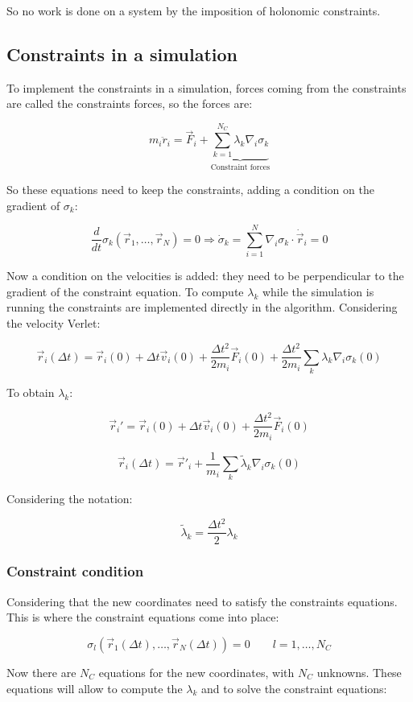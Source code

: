 	So no work is done on a system by the imposition of holonomic constraints.

	\subsection{Constraints in a simulation}
	To implement the constraints in a simulation, forces coming from the constraints are called the constraints forces, so the forces are:

	$$m_i\ddot{r}_i = \vec{F}_i + \underbrace{\sum\limits_{k=1}^{N_C}\lambda_k\nabla_i\sigma_k}_{\text{Constraint forces}}$$

	So these equations need to keep the constraints, adding a condition on the gradient of $\sigma_k$:

	$$\frac{d}{dt}\sigma_k(\vec{r}_1, \dots, \vec{r}_N) = 0\Rightarrow\dot{\sigma}_k = \sum\limits_{i=1}^N\nabla_i\sigma_k\cdot\dot{\vec{r}}_i = 0$$

	Now a condition on the velocities is added: they need to be perpendicular to the gradient of the constraint equation.
	To compute $\lambda_k$ while the simulation is running the constraints are implemented directly in the algorithm.
	Considering the velocity Verlet:

	$$\vec{r}_i(\Delta t) = \vec{r}_i(0) + \Delta t\vec{v}_i(0) + \frac{\Delta t^2}{2m_i}\vec{F}_i(0) + \frac{\Delta t^2}{2m_i}\sum\limits_{k}\lambda_k\nabla_i\sigma_k(0)$$

	To obtain $\lambda_k$:

	$$\vec{r}_i' = \vec{r}_i(0) + \Delta t\vec{v}_i(0) + \frac{\Delta t^2}{2m_i}\vec{F}_i(0)$$

	$$\vec{r}_i(\Delta t) = \vec{r}'_i + \frac{1}{m_i}\sum\limits_k\tilde{\lambda}_k\nabla_i\sigma_k(0)$$

	Considering the notation:

	$$\tilde{\lambda}_k = \frac{\Delta t^2}{2}\lambda_k$$

		\subsubsection{Constraint condition}
		Considering that the new coordinates need to satisfy the constraints equations.
		This is where the constraint equations come into place:

		$$\sigma_l(\vec{r}_1(\Delta t), \dots, \vec{r}_N(\Delta t)) = 0\qquad l = 1, \dots, N_C$$

		Now there are $N_C$ equations for the new coordinates, with $N_C$ unknowns.
		These equations will allow to compute the $\lambda_k$ and to solve the constraint equations:

